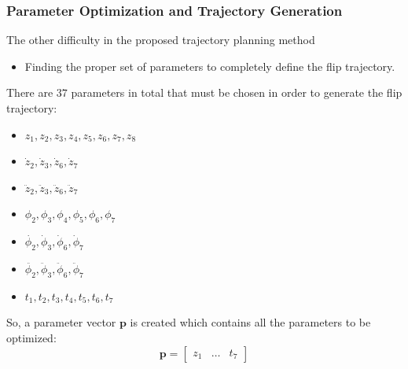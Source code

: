 \documentclass{thesisbeamer}
\newcommand\Fontvi{\fontsize{9}{10}\selectfont}
\begin{document}
\begin{frame}
	\frametitle{Parameter Optimization and Trajectory Generation}
	\Fontvi
	

	\begingroup
    \fontsize{9pt}{10pt}\selectfont
    \begin{alertblock}{	The other difficulty in the proposed trajectory planning method}
		\begin{itemize}
		\item Finding the proper set of parameters to completely define the flip trajectory.
	\end{itemize}
		\end{alertblock}
	\endgroup		

	\vfill	
	
	There are $37$ parameters in total that must be chosen in order to generate the flip trajectory:

\begin{itemize}
	\item $z_1,z_2,z_3,z_4,z_5,z_6,z_7,z_8$
	\item $\dot{z}_2, \dot{z}_3, \dot{z}_6, \dot{z}_7$
	\item $\ddot{z}_2, \ddot{z}_3, \ddot{z}_6, \ddot{z}_7$
	\item $\phi_2, \phi_3, \phi_4, \phi_5, \phi_6, \phi_7$
	\item $\dot{\phi_2}, \dot{\phi}_3, \dot{\phi}_6, \dot{\phi}_7$
	\item $\ddot{\phi_2}, \ddot{\phi}_3, \ddot{\phi}_6, \ddot{\phi}_7$
	\item $t_1, t_2, t_3, t_4, t_5, t_6, t_7$
\end{itemize}

So, a parameter vector $\bm{p}$ is created which contains all the parameters to be optimized:
\begin{equation}
	\bm{p} = \begin{bmatrix}
	z_1 & \ldots & t_7
		\end{bmatrix}
\end{equation}
\end{frame}
\end{document}
